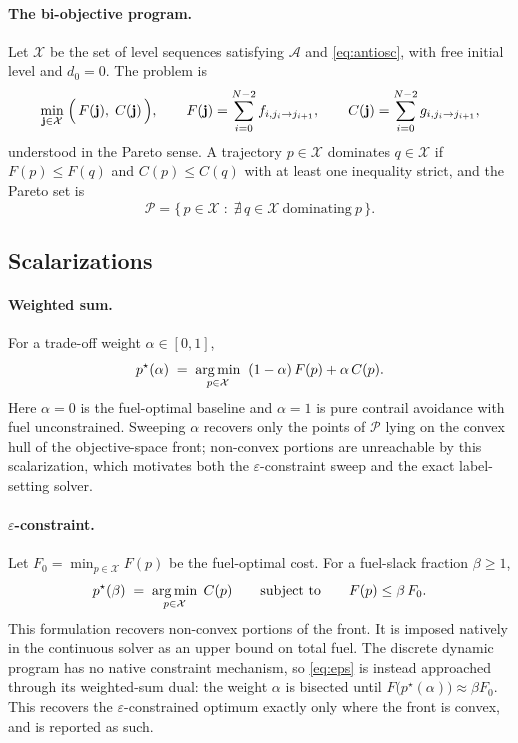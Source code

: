 \paragraph{The bi-objective program.}
Let $\mathcal{X}$ be the set of level sequences satisfying $\mathcal{A}$ and
\eqref{eq:antiosc}, with free initial level and $d_0=0$. The problem is
%
\begin{equation}
  \min_{\mathbf{j}\in\mathcal{X}}\;
  \Bigl(\,F(\mathbf{j}),\;C(\mathbf{j})\,\Bigr),
  \qquad
  F(\mathbf{j})=\sum_{i=0}^{N-2} f_{i,j_i\to j_{i+1}},
  \qquad
  C(\mathbf{j})=\sum_{i=0}^{N-2} g_{i,j_i\to j_{i+1}},
  \label{eq:biobjective}
\end{equation}
%
understood in the Pareto sense. A trajectory $p\in\mathcal{X}$ dominates
$q\in\mathcal{X}$ if $F(p)\le F(q)$ and $C(p)\le C(q)$ with at least one
inequality strict, and the Pareto set is
%
\begin{equation}
  \mathcal{P} = \bigl\{\,p\in\mathcal{X} \;:\;
  \nexists\, q\in\mathcal{X}\ \text{dominating}\ p \,\bigr\}.
  \label{eq:pareto-set}
\end{equation}

\subsection{Scalarizations}
\label{sec:scal}

\paragraph{Weighted sum.}
For a trade-off weight $\alpha\in[0,1]$,
%
\begin{equation}
  p^\star(\alpha)\;=\;
  \operatorname*{arg\,min}_{p\in\mathcal{X}}\;\;(1-\alpha)\,F(p)+\alpha\,C(p).
  \label{eq:ws}
\end{equation}
%
Here $\alpha=0$ is the fuel-optimal baseline and $\alpha=1$ is pure contrail
avoidance with fuel unconstrained. Sweeping $\alpha$ recovers only the points of
$\mathcal{P}$ lying on the convex hull of the objective-space front; non-convex
portions are unreachable by this scalarization, which motivates both the
$\varepsilon$-constraint sweep and the exact label-setting solver.

\paragraph{$\varepsilon$-constraint.}
Let $F_0=\min_{p\in\mathcal{X}}F(p)$ be the fuel-optimal cost. For a fuel-slack
fraction $\beta\ge 1$,
%
\begin{equation}
  p^\star(\beta)\;=\;\operatorname*{arg\,min}_{p\in\mathcal{X}}\;C(p)
  \qquad\text{subject to}\qquad F(p)\le \beta\,F_0 .
  \label{eq:eps}
\end{equation}
%
This formulation recovers non-convex portions of the front. It is imposed
natively in the continuous solver as an upper bound on total fuel. The discrete
dynamic program has no native constraint mechanism, so \eqref{eq:eps} is instead
approached through its weighted-sum dual: the weight $\alpha$ is bisected until
$F\bigl(p^\star(\alpha)\bigr)\approx\beta F_0$. This recovers the
$\varepsilon$-constrained optimum exactly only where the front is convex, and is
reported as such.

